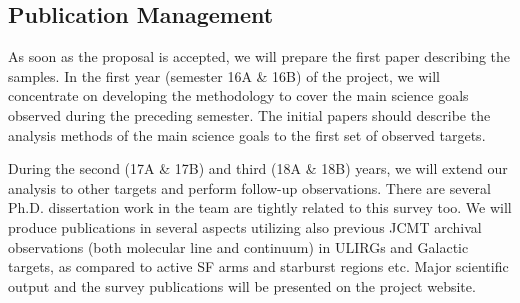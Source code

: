 \documentclass[legal,11pt]{article}
\begin{document}
\subsection{Publication Management} 

As soon as the proposal is accepted, we will prepare the first paper describing
the samples. In the first year (semester 16A \& 16B) of the project, we will
concentrate on developing the methodology to cover the main science goals
observed during the preceding semester. The initial papers should describe the
analysis methods of the main science goals to the first set of observed
targets.  

During the second (17A \& 17B) and third (18A \& 18B) years, we will extend our
analysis to other targets and perform follow-up observations. There are several
Ph.D. dissertation work in the team are tightly related to this survey too. We
will produce publications in several aspects utilizing also previous JCMT
archival observations (both molecular line and continuum) in ULIRGs and
Galactic targets, as compared to active SF arms and starburst regions etc. 
Major scientific output and the survey publications will be presented on the
project website. 



\setlength{\bibsep}{0pt}
\begin{multicols}{2}

{\footnotesize
{}
}
\end{multicols}




\end{document}
